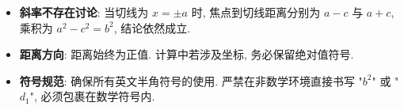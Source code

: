 \begin{trapbox}
\begin{itemize}
    \item \textbf{斜率不存在讨论}: 当切线为 $x = \pm a$ 时, 焦点到切线距离分别为 $a-c$ 与 $a+c$, 乘积为 $a^2-c^2=b^2$, 结论依然成立.
    \item \textbf{距离方向}: 距离始终为正值. 计算中若涉及坐标, 务必保留绝对值符号.
    \item \textbf{符号规范}: 确保所有英文半角符号的使用. 严禁在非数学环境直接书写 "$b^2$" 或 "$d_1$", 必须包裹在数学符号内.
\end{itemize}
\end{trapbox}
